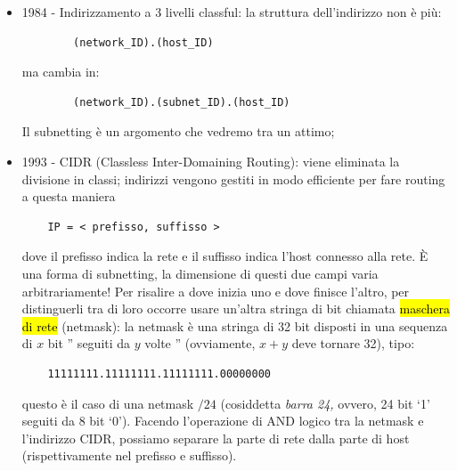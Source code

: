 \begin{itemize}
\begin{table}[h]
\begin{tabular}{cc}
  &  \\ \hline
\end{tabular}
\end{table}

    Questo sistema 2-layer classful è deprecato, non più in uso, ma talvolta viene chiesto all'esame, quindi il mio consiglio spassionato è: esercitatevi a convertire i numeri dal decimale al binario o memorizzate i numeri che delimitano le classi (0, 128, 192, 224 e 240. Gli intervalli, naturalmente, sono $0\div127$, $128\div191$, $192\div223$, $224\div239$ e $240\div255$.);
\item 1984 - Indirizzamento a 3 livelli classful: la struttura dell'indirizzo non è più: \begin{verbatim}
        (network_ID).(host_ID)
    \end{verbatim}
ma cambia in: \begin{verbatim}
        (network_ID).(subnet_ID).(host_ID)
    \end{verbatim}

Il subnetting è un argomento che vedremo tra un attimo;
\item 1993 - CIDR (Classless Inter-Domaining Routing): viene eliminata la divisione in classi; indirizzi vengono gestiti in modo efficiente per fare routing a questa maniera \begin{verbatim}
    IP = < prefisso, suffisso >
\end{verbatim} 
dove il prefisso indica la rete e il suffisso indica l'host connesso alla rete. È una forma di subnetting, la dimensione di questi due campi varia arbitrariamente! Per risalire a dove inizia uno e dove finisce l'altro, per distinguerli tra di loro occorre usare un'altra stringa di bit chiamata \hl{maschera di rete} (netmask): la netmask è una stringa di 32 bit disposti in una sequenza di $x$ bit '' seguiti da $y$ volte '' (ovviamente, $x+y$ deve tornare 32), tipo:
\begin{verbatim}
    11111111.11111111.11111111.00000000
\end{verbatim}
\noindent questo è il caso di una netmask $/24$ (cosiddetta \textit{barra 24,} ovvero, 24 bit `1' seguiti da 8 bit `0').
Facendo l'operazione di AND logico tra la netmask e l'indirizzo CIDR, possiamo separare la parte di rete dalla parte di host (rispettivamente nel prefisso e suffisso).
\end{itemize}

